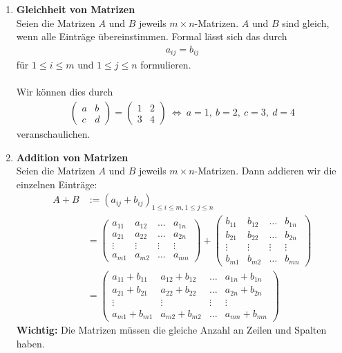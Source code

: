 \begin{enumerate}

\item \textbf{Gleichheit von Matrizen}
\vspace{0.2cm}\\
Seien die Matrizen $A $ und $B$ jeweils $m \times n $-Matrizen.
$A$ und $B$ sind gleich, wenn alle Einträge übereinstimmen.
Formal lässt sich das durch
\begin{align*}
a_{ij} = b_{ij}
\end{align*}
für $1 \leq i \leq m$ und $1 \leq j \leq n$ formulieren.\\ \\
Wir können dies durch
\begin{align*}
\begin{pmatrix}
a & b \\
c & d
\end{pmatrix}
=
\begin{pmatrix}
1 & 2 \\
3 & 4
\end{pmatrix}
\
\Leftrightarrow
\ 
a = 1, \ b = 2, \ c = 3, \ d = 4
\end{align*}
veranschaulichen.
\item \textbf{Addition von Matrizen}\vspace{0.2cm}\\
Seien die Matrizen $A $ und $B$ jeweils $m \times n $-Matrizen.
Dann addieren wir die einzelnen Einträge:
\begin{align*}
A+B &:=(a_{ij} + b_{ij})_{1 \leq i \leq m,1 \leq j \leq n}\\
&=
\begin{pmatrix}
a_{11} & a_{12} & \dots & a_{1n}\\
a_{21} & a_{22} & \dots & a_{2n}\\
\vdots & \vdots & \vdots & \vdots\\
a_{m1} & a_{m2} & \hdots & a_{mn}
\end{pmatrix}
+
\begin{pmatrix}
b_{11} & b_{12} & \dots & b_{1n}\\
b_{21} & b_{22} & \dots & b_{2n}\\
\vdots & \vdots & \vdots & \vdots\\
b_{m1} & b_{m2} & \hdots & b_{mn}
\end{pmatrix}\\
&=
\begin{pmatrix}
a_{11} +b_{11} & a_{12} + b_{12} & \dots & a_{1n}+b_{1n}\\
a_{21} + b_{21} & a_{22} + b_{22} & \dots & a_{2n}+b_{2n}\\
\vdots & \vdots & \vdots & \vdots\\
a_{m1} + b_{m1} & a_{m2} + b_{m2} & \hdots & a_{mn} + b_{mn}
\end{pmatrix}
\end{align*}
\textbf{Wichtig:} Die Matrizen müssen die gleiche Anzahl an Zeilen und Spalten haben.


\end{enumerate}
